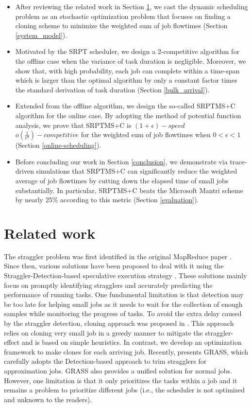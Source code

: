 \documentclass[10pt,conference,compsocconf,letterpaper]{IEEEtran}
\begin{document}
\begin{itemize}
\item After reviewing the related work in Section \ref{related_work}, we cast the dynamic scheduling problem as an stochastic optimization problem that focuses on finding a cloning scheme to minimize the weighted sum of job flowtimes (Section \ref{system_model}).
\item Motivated by the SRPT scheduler, we design a 2-competitive algorithm for the offline case when the variance of task duration is negligible. Moreover, we show that,
with high probability, each job can complete within a time-span which is larger than the optimal algorithm by only a constant factor times the standard derivation of task duration (Section \ref{bulk_arrival}).
\item Extended from the offline algorithm, we design the so-called SRPTMS+C algorithm for the online case.
By adopting the method of potential function analysis,
we prove that SRPTMS+C is $(1+\epsilon)-speed$ $o(\frac{1}{\epsilon^2})-competitive$ for the weighted sum of job
flowtimes when $0< \epsilon < 1$ (Section \ref{online-scheduling}).
\item Before concluding our work in Section \ref{conclusion},  we demonstrate via trace-driven simulations that SRPTMS+C can significantly reduce the weighted average of job flowtimes by cutting down the elapsed time of small jobs substantially. In particular, SRPTMS+C beats the Microsoft Mantri scheme by nearly 25\% according to this metric (Section \ref{evaluation}). 
\end{itemize}



\section{Related work}
\label{related_work}
The straggler problem was first identified in the original MapReduce paper \cite{mapreduce:google}. Since then, various solutions have been proposed to deal with it using the
Straggler-Detection-based  speculative execution strategy \cite{Dryad,Performance,Outliers,Smart_Speculative}. These solutions mainly focus on promptly identifying
 stragglers and accurately predicting the performance of running tasks.  One fundamental limitation is that detection may be too late for helping small jobs as it needs to wait for the collection of enough samples while monitoring the progress of tasks. To avoid the extra delay caused by the straggler detection, cloning approach was proposed in \cite{Cloning}. This approach
 relies on cloning very small job in a greedy manner to mitigate the straggler-effect and is based on simple heuristics. In contrast, we develop an optimization framework to make clones for each arriving job. Recently, \cite{grass} presents GRASS, which carefully adopts the Detection-based approach to trim stragglers for approximation jobs. GRASS also provides a unified solution for normal jobs. However, one limitation is that it only prioritizes the tasks within a job and it remains a problem to prioritize different jobs (i.e., the scheduler is not optimized and unknown to the readers).
\end{document}
